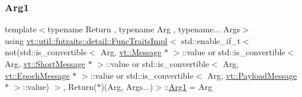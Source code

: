 \subsubsection{\texorpdfstring{Arg1}{Arg1}}
{\footnotesize\ttfamily template$<$typename Return , typename Arg , typename... Args$>$ \\
using \hyperlink{structvt_1_1util_1_1fntraits_1_1detail_1_1_func_traits_impl}{vt\+::util\+::fntraits\+::detail\+::\+Func\+Traits\+Impl}$<$ std\+::enable\+\_\+if\+\_\+t$<$ not(std\+::is\+\_\+convertible$<$ Arg, \hyperlink{namespacevt_a3a3ddfef40b4c90915fa43cdd5f129ea}{vt\+::\+Message} $\ast$ $>$\+::value or std\+::is\+\_\+convertible$<$ Arg, \hyperlink{namespacevt_a1125ac1da6c0bbf141e0ea0739d7602d}{vt\+::\+Short\+Message} $\ast$ $>$\+::value or std\+::is\+\_\+convertible$<$ Arg, \hyperlink{namespacevt_ad67368ffae52d7325002586b41bb150e}{vt\+::\+Epoch\+Message} $\ast$ $>$\+::value or std\+::is\+\_\+convertible$<$ Arg, \hyperlink{namespacevt_a89a92229c5622b855c02c549f83a1a68}{vt\+::\+Payload\+Message} $\ast$ $>$\+::value) $>$, Return($\ast$)(Arg, Args...)$>$\+::\hyperlink{structvt_1_1util_1_1fntraits_1_1detail_1_1_func_traits_impl_3_01std_1_1enable__if__t_3_01not_07s3fd5866f31025a6fa1e7500192630846_a69f65a6edbf46974391f9f689992d6f4}{Arg1} =  Arg}

